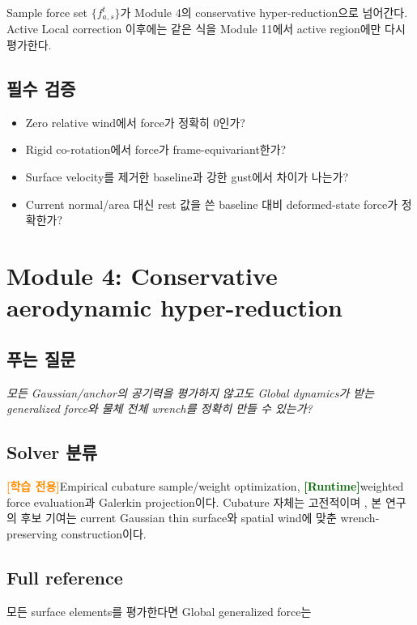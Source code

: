 \documentclass[11pt,a4paper]{article}
\newcommand{\trainonly}{\textcolor{darkorange}{\textbf{[학습 전용]}}}
\newcommand{\runtime}{\textcolor{darkgreen}{\textbf{[Runtime]}}}
\begin{document}
Sample force set \(\{f_{a,s}^t\}\)가 Module 4의 conservative hyper-reduction으로 넘어간다.
Active Local correction 이후에는 같은 식을 Module 11에서 active region에만 다시 평가한다.

\subsection*{필수 검증}

\begin{itemize}[leftmargin=1.5em]
  \item Zero relative wind에서 force가 정확히 0인가?
  \item Rigid co-rotation에서 force가 frame-equivariant한가?
  \item Surface velocity를 제거한 baseline과 강한 gust에서 차이가 나는가?
  \item Current normal/area 대신 rest 값을 쓴 baseline 대비 deformed-state force가 정확한가?
\end{itemize}

\section{Module 4: Conservative aerodynamic hyper-reduction}

\subsection*{푸는 질문}

\emph{모든 Gaussian/anchor의 공기력을 평가하지 않고도
Global dynamics가 받는 generalized force와 물체 전체 wrench를 정확히 만들 수 있는가?}

\subsection*{Solver 분류}

\trainonly Empirical cubature sample/weight optimization,
\runtime weighted force evaluation과 Galerkin projection이다.
Cubature 자체는 고전적이며 \cite{an2008cubature},
본 연구의 후보 기여는 current Gaussian thin surface와 spatial wind에 맞춘 wrench-preserving construction이다.

\subsection*{Full reference}

모든 surface elements를 평가한다면 Global generalized force는
\end{document}
